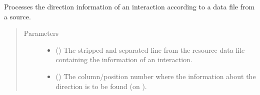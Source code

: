 \documentclass[letterpaper,10pt,english]{sphinxmanual}
\begin{document}
\begin{fulllineitems}
\begin{fulllineitems}
\label{\detokenize{main:pypath.main.PyPath.phosphorylation_signs}}
\end{fulllineitems}


\begin{fulllineitems}
\label{\detokenize{main:pypath.main.PyPath.phosphosite_directions}}
\end{fulllineitems}


\begin{fulllineitems}
\label{\detokenize{main:pypath.main.PyPath.prdb_tissue_expr}}
\end{fulllineitems}


\begin{fulllineitems}
\label{\detokenize{main:pypath.main.PyPath.process_direction}}
Processes the direction information of an interaction according
to a data file from a source.
\begin{quote}\begin{description}
\item[{Parameters}] \leavevmode\begin{itemize}
\item {} 
 () \textendash{} The stripped and separated line from the resource data file
containing the information of an interaction.

\item {} 
 () \textendash{} The column/position number where the information about the
direction is to be found (on ).


\end{itemize}
\end{description}
\end{quote}
\end{fulllineitems}
\end{fulllineitems}
\end{document}
